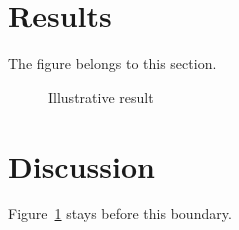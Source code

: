 \documentclass[11pt]{article}
\begin{document}
\section{Results}The figure belongs to this section.
\begin{figure}[htbp]\centering\fbox{\rule{0pt}{20mm}\rule{.7\linewidth}{0pt}}\caption{Illustrative result}\label{fig:result}\end{figure}
\FloatBarrier
\section{Discussion}Figure~\ref{fig:result} stays before this boundary.
\end{document}
